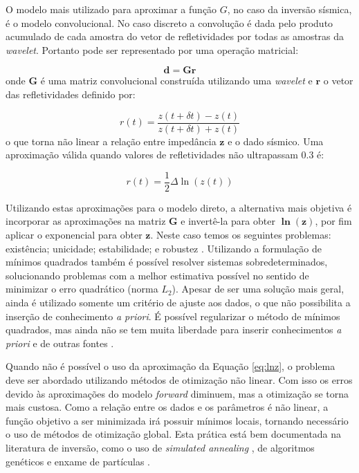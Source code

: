 O modelo mais utilizado para aproximar a função $G$, no caso da inversão
sísmica, é o modelo convolucional. No caso discreto a convolução é dada pelo
produto acumulado de cada amostra do vetor de refletividades por todas as
amostras da \textit{wavelet}. Portanto pode ser representado por uma operação
matricial:

\begin{equation}
\label{eq:sismDiscreta}
\mathbf{d = Gr}
\end{equation}
onde $\mathbf{G}$ é uma matriz convolucional construída utilizando uma
\textit{wavelet} e $\mathbf r$ o vetor das refletividades definido por:

\begin{equation}
\label{eq:refletDiscreta}
r(t)=\frac{z(t+\delta t) - z(t)}{z(t+\delta t) + z(t)}
\end{equation}
o que torna não linear a relação entre impedância $\mathbf z$ e o dado sísmico.
Uma aproximação válida quando valores de refletividades não ultrapassam $0.3$ é:


\begin{equation}
r(t) = \frac{1}{2}\Delta \ln(z(t))
\label{eq:lnz}
\end{equation}


Utilizando estas aproximações para o modelo direto, a alternativa mais objetiva
é incorporar as aproximações na matriz $\mathbf{G}$ e invertê-la para obter
$\mathbf{\ln(z)}$, por fim aplicar o exponencial para obter $\mathbf{z}$.
Neste caso temos os seguintes problemas: existência; unicidade; estabilidade; e
robustez \citep[p. 56-57]{sen_livro}. Utilizando a formulação de mínimos
quadrados também é possível resolver sistemas sobredeterminados, solucionando
problemas com a melhor estimativa possível no sentido de minimizar o erro
quadrático (norma $L_2$). Apesar de ser uma solução mais geral, ainda é
utilizado somente um critério de ajuste aos dados, o que não possibilita a
inserção de conhecimento \textit{a priori}. É possível regularizar o método de
mínimos quadrados, mas ainda não se tem muita liberdade para inserir
conhecimentos \textit{a priori} e de outras fontes \citep{clappRegLeast3D}.


Quando não é possível o uso da aproximação da Equação \ref{eq:lnz}, o problema
deve ser abordado utilizando métodos de otimização não linear. Com isso os erros
devido às aproximações do modelo \textit{forward} diminuem, mas a otimização se
torna mais custosa. Como a relação entre os dados e os parâmetros é não linear, a
função objetivo a ser minimizada irá possuir mínimos locais, tornando necessário
o uso de métodos de otimização global. Esta prática está bem documentada na
literatura de inversão, como o uso de \textit{simulated annealing}
\citep{max_inv_simulated}, de algoritmos genéticos \citep{MallickGeneticInve} e
enxame de partículas \citep{zhe_nonlinear}. 


